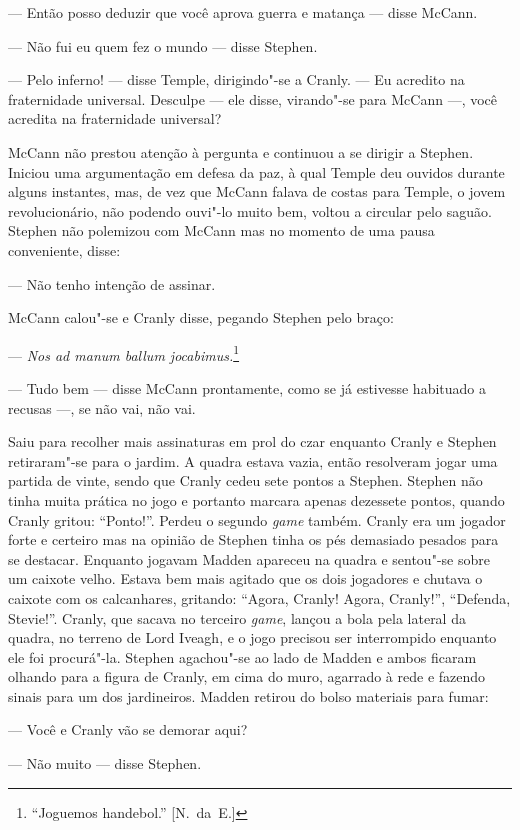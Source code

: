 --- Então posso deduzir que você aprova guerra e matança --- disse McCann.

--- Não fui eu quem fez o mundo --- disse Stephen.

--- Pelo inferno! --- disse Temple, dirigindo"-se a Cranly.  --- Eu acredito na
fraternidade universal.  Desculpe --- ele disse, virando"-se para McCann ---,
você acredita na fraternidade universal?

McCann não prestou atenção à pergunta e continuou a se dirigir a Stephen.
Iniciou uma argumentação em defesa da paz, à qual Temple deu ouvidos durante
alguns instantes, mas, de vez que McCann falava de costas para Temple, o jovem
revolucionário, não podendo ouvi"-lo muito bem, voltou a circular pelo saguão.
Stephen não polemizou com McCann mas no momento de uma pausa conveniente,
disse:

--- Não tenho intenção de assinar.

McCann calou"-se e Cranly disse, pegando Stephen pelo braço:

--- \textit{Nos ad manum ballum jocabimus.}\footnote{ ``Joguemos handebol.'' [N.~da~E.]} 

--- Tudo bem --- disse McCann prontamente, como se já estivesse habituado a
recusas ---, se não vai, não vai.

Saiu para recolher mais assinaturas em prol do czar enquanto Cranly e Stephen
retiraram"-se para o jardim.  A quadra estava vazia, então resolveram jogar uma
partida de vinte, sendo que Cranly cedeu sete pontos a Stephen.  Stephen não
tinha muita prática no jogo e portanto marcara apenas dezessete pontos, quando
Cranly gritou: “Ponto!”.  Perdeu o segundo \textit{game} também.  Cranly era um
jogador forte e certeiro mas na opinião de Stephen tinha os pés demasiado
pesados para se destacar.  Enquanto jogavam Madden apareceu na quadra e
sentou"-se sobre um caixote velho.  Estava bem mais agitado que os dois
jogadores e chutava o caixote com os calcanhares, gritando: “Agora, Cranly!
Agora, Cranly!”, “Defenda, Stevie!”.  Cranly, que sacava no terceiro
\textit{game}, lançou a bola pela lateral da quadra, no terreno de Lord Iveagh,
e o jogo precisou ser interrompido enquanto ele foi procurá"-la.  Stephen
agachou"-se ao lado de Madden e ambos ficaram olhando para a figura de Cranly,
em cima do muro, agarrado à rede e fazendo sinais para um dos jardineiros.
Madden retirou do bolso materiais para fumar:

--- Você e Cranly vão se demorar aqui?

--- Não muito --- disse Stephen.

